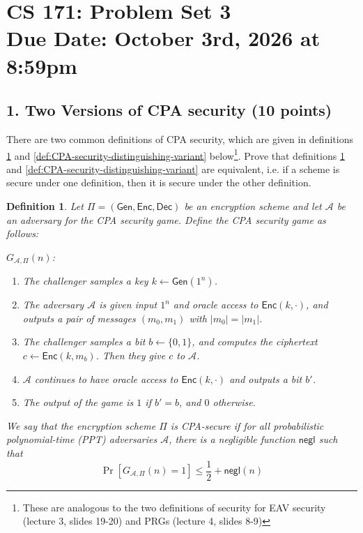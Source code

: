 \documentclass[11pt]{article}
\newcommand{\Gen}{\mathsf{Gen}}
\newcommand{\Enc}{\mathsf{Enc}}
\newcommand{\Dec}{\mathsf{Dec}}
\newcommand{\A}{\mathcal{A}}
\newcommand{\negl}{\mathsf{negl}}
\newtheorem{definition}[theorem]{Definition}
\numberwithin{equation}{section}
\newcommand{\duedate}{October 3rd, 2026 at 8:59pm}
\begin{document}
\section*{CS 171: Problem Set 3\\ {\small Due Date: \duedate} }

\subsection*{1. Two Versions of CPA security (10 points)}
There are two common definitions of CPA security, which are given in definitions \ref{def:CPA-security-predicting-variant} and \ref{def:CPA-security-distinguishing-variant} below\footnote{These are analogous to the two definitions of security for EAV security (lecture 3, slides 19-20) and PRGs (lecture 4, slides 8-9)}. Prove that definitions \ref{def:CPA-security-predicting-variant} and \ref{def:CPA-security-distinguishing-variant} are equivalent, i.e. if a scheme is secure under one definition, then it is secure under the other definition.

\begin{definition}\label{def:CPA-security-predicting-variant}
Let $\Pi = (\Gen, \Enc, \Dec)$ be an encryption scheme and let $\A$ be an adversary for the CPA security game. Define the CPA security game as follows:\newline

\noindent\underline{$G_{\A, \Pi}(n)$}:
\begin{enumerate}
    \item The challenger samples a key $k \leftarrow \Gen(1^n)$.
    \item The adversary $\A$ is given input $1^n$ and oracle access to $\Enc(k, \cdot)$, and outputs a pair of messages $(m_0, m_1)$ with $|m_0| = |m_1|$.
    \item The challenger samples a bit $b \leftarrow \{0,1\}$, and computes the ciphertext $c \leftarrow \Enc(k, m_b)$. Then they give $c$ to $\A$.
    \item $\A$ continues to have oracle access to $\Enc(k, \cdot)$ and outputs a bit $b'$.
    \item The output of the game is $1$ if $b' = b$, and $0$ otherwise.
\end{enumerate}

We say that the encryption scheme $\Pi$ is CPA-secure if for all probabilistic polynomial-time (PPT) adversaries $\A$, there is a negligible function $\negl$ such that
\[\Pr\left[G_{\A, \Pi}(n) = 1\right] \leq \frac{1}{2} + \negl(n)\]
\end{definition}
\end{document}
